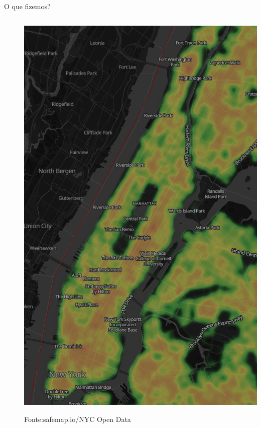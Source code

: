 \documentclass{beamer} %
\theoremstyle{definition}
\begin{document}
\begin{frame}{O que fizemos?}
\begin{columns}
\begin{column}{0.5\textwidth}
\begin{enumerate}
            \end{enumerate}
        \end{column}
        \begin{column}{0.5\textwidth}
            \pause
            \centering
            \includegraphics[width=\textwidth, height=0.8\textheight, keepaspectratio]{crimemap.png}
            \caption{\scriptsize{Fonte:safemap.io/NYC Open Data}}
        \end{column}
    \end{columns}
    \end{frame}
    
\end{document}
